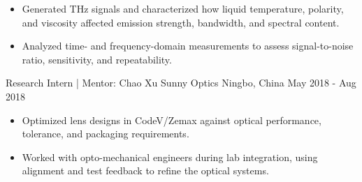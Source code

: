 \begin{cventries}
{\begin{itemize}[leftmargin=2ex,topsep=2pt]
        \item Generated THz signals and characterized how liquid temperature, polarity, and viscosity affected emission strength, bandwidth, and spectral content.
        \item Analyzed time- and frequency-domain measurements to assess signal-to-noise ratio, sensitivity, and repeatability.
      \end{itemize}
    }\projectentrygap
  \cventry
    {Research Intern | Mentor: Chao Xu}
    {Sunny Optics}
    {Ningbo, China}
    {May 2018 - Aug 2018}
    {
      \begin{itemize}[leftmargin=2ex,topsep=2pt]
        \item Optimized lens designs in CodeV/Zemax against optical performance, tolerance, and packaging requirements.
        \item Worked with opto-mechanical engineers during lab integration, using alignment and test feedback to refine the optical systems.
      \end{itemize}
    }
\end{cventries}
